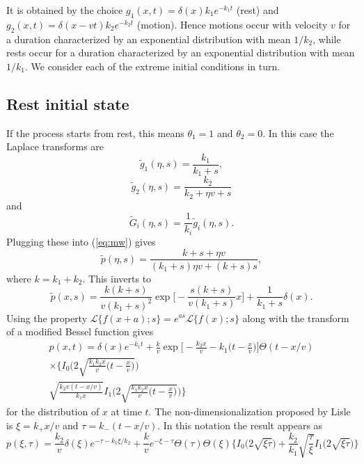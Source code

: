 \documentclass[11pt]{article}
\newcommand\be{\begin{equation}} %
\newcommand\ee{\end{equation}}   %
\newcommand\El{\mathcal{L}}
\newcommand\tg{\tilde{g}}
\newcommand\tG{\tilde{G}}
\begin{document}
It is obtained by the choice $g_1(x,t) = \delta(x) k_1 e^{-k_1 t}$ (rest) and $g_2(x,t) = \delta(x-vt)k_2 e^{-k_2 t} $ (motion).
Hence motions occur with velocity $v$ for a duration characterized by an exponential distribution with mean $1/k_2$, while rests occur for a duration characterized by an exponential distribution with mean $1/k_1$. 
We consider each of the extreme initial conditions in turn.

\subsection{Rest initial state}

If the process starts from rest, this means $\theta_1 = 1$ and $\theta_2=0$.
In this case the Laplace transforms are
\be \tg_1(\eta,s) = \frac{k_1}{k_1 + s}, \ee 
\be \tg_2(\eta,s) = \frac{k_2}{k_2 + \eta v + s }\ee
and
\be \tG_i(\eta,s) = \frac{1}{k_i}\tg_i(\eta,s).\ee
Plugging these into (\ref{eq:mw}) gives
\be \tilde{p}(\eta,s) = \frac{k + s + \eta v }{(k_1+s) \eta v  + (k+s)s },\ee
where $k = k_1 + k_2$. 
This inverts to 
\be \tilde{p}(x,s) = \frac{k(k+s)}{v(k_1+s)^2} \exp\Big[-\frac{s(k+s)}{v(k_1+s)}x\Big] + \frac{1}{k_1+s}\delta(x) .\ee
Using the property $ \El\{f(x+a);s\} = e^{as}\El\{f(x);s\}$ along with the transform of a modified Bessel function gives
\begin{multline}
p(x,t) = \delta(x) e^{-k_1 t} + \frac{k}{v}\exp\Big[-\frac{k_2x }{v} - k_1\Big(t-\frac{x}{v}\Big)\Big]\Theta(t-x/v)\\ 
\times \Big\{ I_0\Big(2\sqrt{\frac{k_1k_2x}{v}\big(t-\frac{x}{v}\big)}\Big) \\
\sqrt{\frac{k_2 v(t-x/v)}{k_1x}}I_1\Big(2\sqrt{\frac{k_1k_2x}{v}\big(t-\frac{x}{v}\big)}\Big) 
\Big\}
\end{multline}
for the distribution of $x$ at time $t$.
The non-dimensionalization proposed by Lisle is $\xi = k_+ x /v$ and $\tau = k_-(t-x/v)$.
In this notation the result appears as
\be p(\xi,\tau) = \frac{k_2}{v}\delta(\xi)e^{-\tau-k_1\xi/k_2} +  \frac{k}{v}e^{-\xi-\tau}\Theta(\tau)\Theta(\xi)\Big\{I_0\big(2\sqrt{\xi \tau}\big) +\frac{k_2}{k_1}\sqrt{\frac{\tau}{\xi}}I_1\big(2\sqrt{\xi\tau}\big) \Big\}\ee
\end{document}
